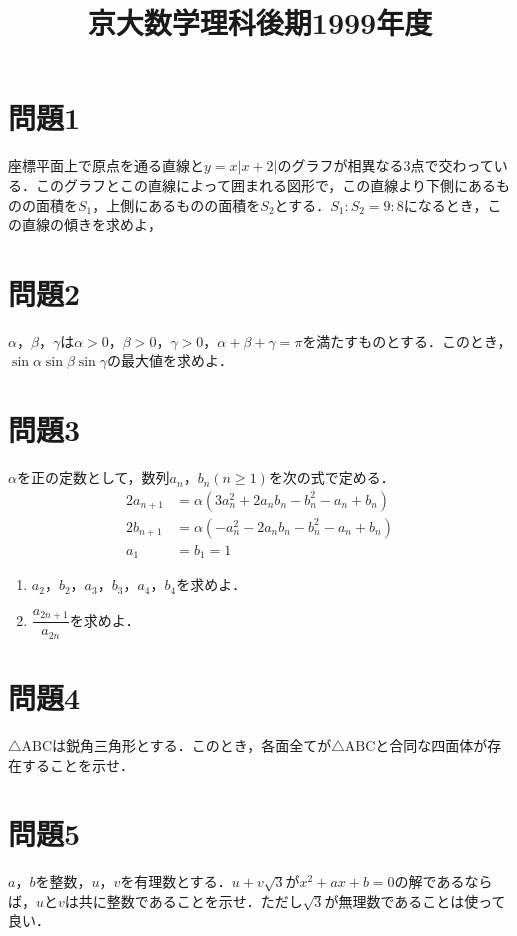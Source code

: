 \documentclass[unicode,12pt, A4j]{ltjsarticle}%
\title{京大数学理科後期1999年度}
\author{}
\date{}
\begin{document}
\maketitle

\section{問題1}
座標平面上で原点を通る直線と$y=x|x+2|$のグラフが相異なる$3$点で交わっている．このグラフとこの直線によって囲まれる図形で，この直線より下側にあるものの面積を$S_1$，上側にあるものの面積を$S_2$とする．$S_1:S_2=9:8$になるとき，この直線の傾きを求めよ，

\section{問題2}
$\alpha$，$\beta$，$\gamma$は$\alpha>0$，$\beta>0$，$\gamma>0$，$\alpha+\beta+\gamma=\pi$を満たすものとする．このとき，$\sin\alpha\sin\beta\sin\gamma$の最大値を求めよ．

\section{問題3}
$\alpha$を正の定数として，数列$a_n$，$b_n (n\ge 1)$を次の式で定める．
\begin{align*}
 2a_{n+1}&=\alpha\left(3a_n^2+2a_nb_n-b_n^2-a_n+b_n\right) \\
 2b_{n+1}&=\alpha\left(-a_n^2-2a_nb_n-b_n^2-a_n+b_n\right) \\
 a_1&=b_1=1
\end{align*}
\begin{enumerate}
 \item $a_2$，$b_2$，$a_3$，$b_3$，$a_4$，$b_4$を求めよ．
 \item $\dfrac{a_{2n+1}}{a_{2n}}$を求めよ．
\end{enumerate}

\section{問題4}
$\triangle \mathrm{ABC}$は鋭角三角形とする．このとき，各面全てが$\triangle\mathrm{ABC}$と合同な四面体が存在することを示せ．


\section{問題5}
$a$，$b$を整数，$u$，$v$を有理数とする．$u+v\sqrt{3}$が$x^2+ax+b=0$の解であるならば，$u$と$v$は共に整数であることを示せ．ただし$\sqrt{3}$が無理数であることは使って良い．
\end{document}

